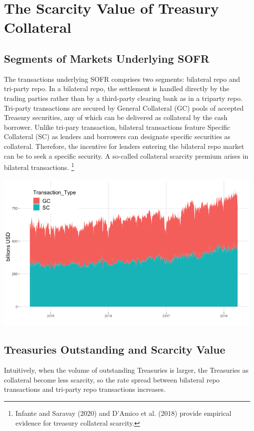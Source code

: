 \documentclass[12pt]{article}
\begin{document}
\newpage
\section{The Scarcity Value of Treasury Collateral}
\subsection{Segments of Markets Underlying SOFR}
The transactions underlying SOFR comprises two segments: bilateral repo and tri-party repo. In a bilateral repo, the settlement is handled directly by the trading parties rather than by a third-party clearing bank as in a triparty repo. Tri-party transactions are secured by General Collateral (GC) pools of accepted Treasury securities, any of which can be delivered as collateral by the cash borrower.  Unlike tri-pary transaction,  bilateral transactions feature Specific Collateral (SC) as lenders and borrowers can designate specific securities as collateral.  Therefore,  the incentive for lenders entering the bilateral repo market can be to seek a specific security.  A so-called collateral scarcity premium arises in bilateral transactions. \footnote{Infante and Saravay (2020) and D’Amico et al.  (2018) provide empirical evidence for treasury collateral scarcity.} \\
\begin{center}
\includegraphics[scale=.5]{fig1.png}
\end{center}


\subsection{Treasuries Outstanding and Scarcity Value}
Intuitively,  when the volume of outstanding Treasuries is larger,  the Treasuries as collateral become less scarcity,  so the rate spread between bilateral repo transactions and tri-party repo transactions increases.  
\end{document}
